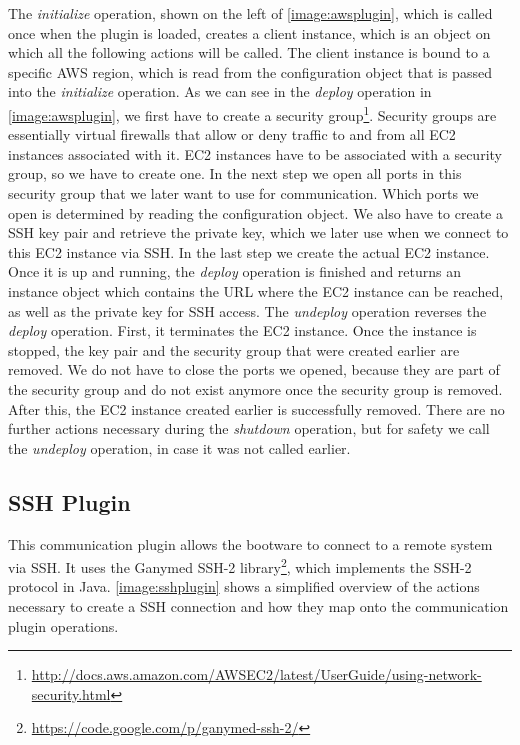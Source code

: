 The \textit{initialize} operation, shown on the left of \autoref{image:awsplugin}, which is called once when the plugin is loaded, creates a client instance, which is an object on which all the following actions will be called.
The client instance is bound to a specific AWS region, which is read from the configuration object that is passed into the \textit{initialize} operation.
As we can see in the \textit{deploy} operation in \autoref{image:awsplugin}, we first have to create a security group\footnote{\url{http://docs.aws.amazon.com/AWSEC2/latest/UserGuide/using-network-security.html}}.
Security groups are essentially virtual firewalls that allow or deny traffic to and from all EC2 instances associated with it.
EC2 instances have to be associated with a security group, so we have to create one.
In the next step we open all ports in this security group that we later want to use for communication.
Which ports we open is determined by reading the configuration object.
We also have to create a SSH key pair and retrieve the private key, which we later use when we connect to this EC2 instance via SSH.
In the last step we create the actual EC2 instance.
Once it is up and running, the \textit{deploy} operation is finished and returns an instance object which contains the URL where the EC2 instance can be reached, as well as the private key for SSH access.
The \textit{undeploy} operation reverses the \textit{deploy} operation.
First, it terminates the EC2 instance.
Once the instance is stopped, the key pair and the security group that were created earlier are removed.
We do not have to close the ports we opened, because they are part of the security group and do not exist anymore once the security group is removed.
After this, the EC2 instance created earlier is successfully removed.
There are no further actions necessary during the \textit{shutdown} operation, but for safety we call the \textit{undeploy} operation, in case it was not called earlier.

\subsection{SSH Plugin}

This communication plugin allows the bootware to connect to a remote system via SSH.
It uses the Ganymed SSH-2 library\footnote{\url{https://code.google.com/p/ganymed-ssh-2/}}, which implements the SSH-2 protocol in Java.
\autoref{image:sshplugin} shows a simplified overview of the actions necessary to create a SSH connection and how they map onto the communication plugin operations.


